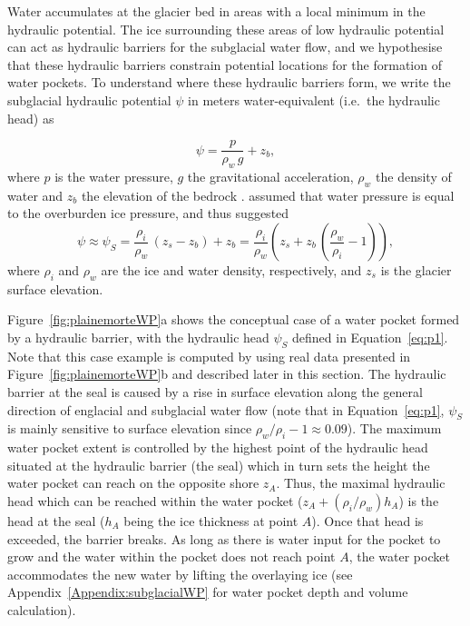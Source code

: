 Water accumulates at the glacier bed in areas with a local minimum in the hydraulic potential. The ice surrounding these areas of low hydraulic potential can act as hydraulic barriers for the subglacial water flow, and we hypothesise that these hydraulic barriers constrain potential locations for the formation of water pockets. To understand where these hydraulic barriers form, we write the subglacial hydraulic potential $\psi$ in meters water-equivalent (i.e.\ the hydraulic head) as

\begin{equation}
     \psi = \frac{p}{\rho_w\,g} + z_b,
     \label{eq:phi1}
\end{equation}
%
where $p$ is the water pressure, $g$ the gravitational acceleration, $\rho_w$ the density of water and $z_b$ the elevation of the bedrock \citep{Cuffey&Paterson2010}. \cite{Shreve1972} assumed that water pressure is equal to the overburden ice pressure, and thus suggested
%
\begin{equation}
     \psi \approx \psi_S = \frac{\rho_i}{\rho_w}\,(z_s - z_b) + z_b = \frac{\rho_i}{\rho_w}\left(z_s + z_b\,\left(\frac{\rho_w}{\rho_i} - 1\right)\right),
     \label{eq:p1}
\end{equation}
%
where $\rho_i$ and $\rho_w$ are the ice and water density, respectively, and $z_s$ is the glacier surface elevation. 

Figure~\ref{fig:plainemorteWP}a shows the conceptual case of a water pocket formed by a hydraulic barrier, with the hydraulic head $\psi_S$ defined in Equation~\ref{eq:p1}. Note that this case example is computed by using real data presented in Figure~\ref{fig:plainemorteWP}b and described later in this section. The hydraulic barrier at the seal is caused by a rise in surface elevation along the general direction of englacial and subglacial water flow (note that in Equation~\ref{eq:p1}, $\psi_S$ is mainly sensitive to surface elevation since $\rho_w/\rho_i - 1 \approx 0.09$). The maximum water pocket extent is controlled by the highest point of the hydraulic head situated at the hydraulic barrier (the seal) which in turn sets the height the water pocket can reach on the opposite shore $z_A$. Thus, the maximal hydraulic head which can be reached within the water pocket ($z_A + (\rho_i/\rho_w) h_A$) is the head at the seal ($h_A$ being the ice thickness at point $A$). Once that head is exceeded, the barrier breaks. As long as there is water input for the pocket to grow and the water within the pocket does not reach point $A$, the water pocket accommodates the new water by lifting the overlaying ice (see Appendix~\ref{Appendix:subglacialWP} for water pocket depth and volume calculation).

